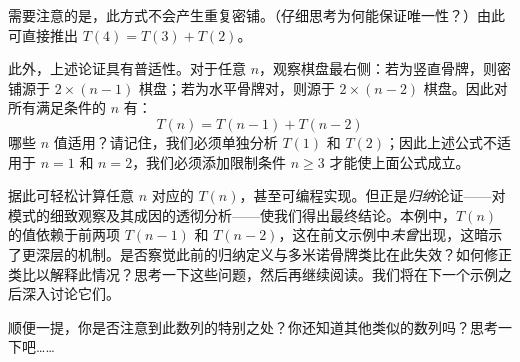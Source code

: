 需要注意的是，此方式不会产生重复密铺。（仔细思考为何能保证唯一性？）由此可直接推出 $T(4) = T(3) + T(2)$。

此外，上述论证具有普适性。对于任意 $n$，观察棋盘最右侧：若为竖直骨牌，则密铺源于 $2 \times (n - 1)$ 棋盘；若为水平骨牌对，则源于 $2 \times (n-2)$ 棋盘。因此对所有满足条件的 $n$ 有：
\[T(n) = T(n - 1) + T(n - 2)\]
哪些 $n$ 值适用？请记住，我们必须单独分析 $T(1)$ 和 $T(2)$；因此上述公式不适用于 $n=1$ 和 $n=2$，我们必须添加限制条件 $n \ge 3$ 才能使上面公式成立。

据此可轻松计算任意 $n$ 对应的 $T(n)$，甚至可编程实现。但正是\emph{归纳}论证——对模式的细致观察及其成因的透彻分析——使我们得出最终结论。本例中，$T(n)$ 的值依赖于前两项 $T(n-1)$ 和 $T(n-2)$，这在前文示例中\emph{未曾}出现，这暗示了更深层的机制。是否察觉此前的归纳定义与多米诺骨牌类比在此失效？如何修正类比以解释此情况？思考一下这些问题，然后再继续阅读。我们将在下一个示例之后深入讨论它们。

顺便一提，你是否注意到此数列的特别之处？你还知道其他类似的数列吗？思考一下吧……
